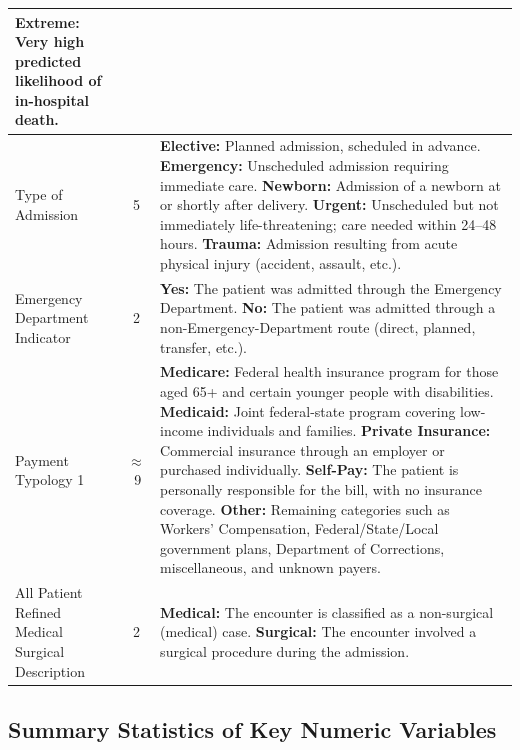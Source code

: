 \documentclass[12pt]{article}
\begin{document}
\begin{table}[H]
\begin{tabular}{p{} c p{}}
\textbf{Extreme:} Very high predicted likelihood of in-hospital death. \\
\midrule
Type of Admission & 5 &
\textbf{Elective:} Planned admission, scheduled in advance.
\newline
\textbf{Emergency:} Unscheduled admission requiring immediate care.
\newline
\textbf{Newborn:} Admission of a newborn at or shortly after delivery.
\newline
\textbf{Urgent:} Unscheduled but not immediately life-threatening; care needed within 24--48 hours.
\newline
\textbf{Trauma:} Admission resulting from acute physical injury (accident, assault, etc.). \\
\midrule
Emergency Department Indicator & 2 &
\textbf{Yes:} The patient was admitted through the Emergency Department.
\newline
\textbf{No:} The patient was admitted through a non-Emergency-Department route (direct, planned, transfer, etc.). \\
\midrule
Payment Typology 1 & $\approx$\,9 &
\textbf{Medicare:} Federal health insurance program for those aged 65+ and certain younger people with disabilities.
\newline
\textbf{Medicaid:} Joint federal-state program covering low-income individuals and families.
\newline
\textbf{Private Insurance:} Commercial insurance through an employer or purchased individually.
\newline
\textbf{Self-Pay:} The patient is personally responsible for the bill, with no insurance coverage.
\newline
\textbf{Other:} Remaining categories such as Workers' Compensation, Federal/State/Local government plans, Department of Corrections, miscellaneous, and unknown payers. \\
\midrule
All Patient Refined Medical Surgical Description & 2 &
\textbf{Medical:} The encounter is classified as a non-surgical (medical) case.
\newline
\textbf{Surgical:} The encounter involved a surgical procedure during the admission. \\
\bottomrule
\end{tabular}
\end{table}

\subsection{Summary Statistics of Key Numeric Variables}
\end{document}
